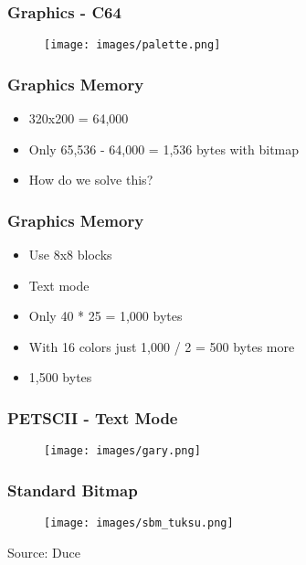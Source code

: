 \begin{frame}
\frametitle{Graphics - C64}

\begin{figure}
\texttt{[image: images/palette.png]}
\end{figure}

\end{frame}


\begin{frame}
\frametitle{Graphics Memory}

\begin{itemize}
\item 320x200 = 64,000
\item Only 65,536 - 64,000 = 1,536 bytes with bitmap
\item How do we solve this?
\end{itemize}

\end{frame}


\begin{frame}
\frametitle{Graphics Memory}

\begin{itemize}
\item Use 8x8 blocks
\item Text mode
\item Only 40 * 25 = 1,000 bytes
\item With 16 colors just 1,000 / 2 = 500 bytes more
\item 1,500 bytes
\end{itemize}

\end{frame}


\begin{frame}
\frametitle{PETSCII - Text Mode}

\begin{figure}
\texttt{[image: images/gary.png]}
\end{figure}

\end{frame}


\begin{frame}
\frametitle{Standard Bitmap}

\begin{figure}
\texttt{[image: images/sbm\_tuksu.png]}
\end{figure}

\begin{center}
Source: Duce
\end{center}

\end{frame}

